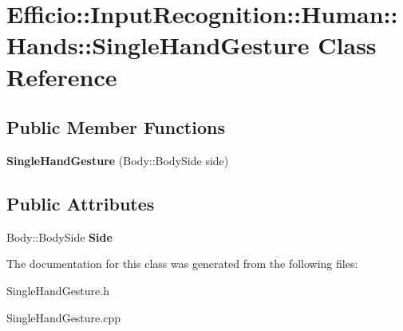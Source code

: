 \hypertarget{class_efficio_1_1_input_recognition_1_1_human_1_1_hands_1_1_single_hand_gesture}{}\section{Efficio\+:\+:Input\+Recognition\+:\+:Human\+:\+:Hands\+:\+:Single\+Hand\+Gesture Class Reference}
\label{class_efficio_1_1_input_recognition_1_1_human_1_1_hands_1_1_single_hand_gesture}
\subsection*{Public Member Functions}
\begin{DoxyCompactItemize}
\item 
{\bfseries Single\+Hand\+Gesture} (Body\+::\+Body\+Side side)\hypertarget{class_efficio_1_1_input_recognition_1_1_human_1_1_hands_1_1_single_hand_gesture_a63a8fc2546dc1a7e5962eb09de469f34}{}\label{class_efficio_1_1_input_recognition_1_1_human_1_1_hands_1_1_single_hand_gesture_a63a8fc2546dc1a7e5962eb09de469f34}

\end{DoxyCompactItemize}
\subsection*{Public Attributes}
\begin{DoxyCompactItemize}
\item 
Body\+::\+Body\+Side {\bfseries Side}\hypertarget{class_efficio_1_1_input_recognition_1_1_human_1_1_hands_1_1_single_hand_gesture_ad46d8585b784c4e9c4425e813fab2d5b}{}\label{class_efficio_1_1_input_recognition_1_1_human_1_1_hands_1_1_single_hand_gesture_ad46d8585b784c4e9c4425e813fab2d5b}

\end{DoxyCompactItemize}


The documentation for this class was generated from the following files\+:\begin{DoxyCompactItemize}
\item 
Single\+Hand\+Gesture.\+h\item 
Single\+Hand\+Gesture.\+cpp\end{DoxyCompactItemize}
